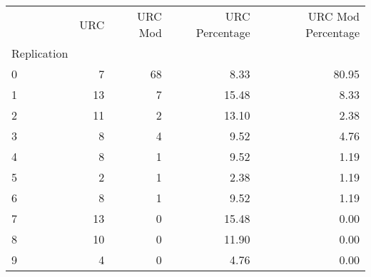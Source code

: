 \begin{tabular}{lrrrr}
\toprule
 & URC & URC Mod & URC Percentage & URC Mod Percentage \\
Replication &  &  &  &  \\
\midrule
0 & 7 & 68 & 8.33 & 80.95 \\
1 & 13 & 7 & 15.48 & 8.33 \\
2 & 11 & 2 & 13.10 & 2.38 \\
3 & 8 & 4 & 9.52 & 4.76 \\
4 & 8 & 1 & 9.52 & 1.19 \\
5 & 2 & 1 & 2.38 & 1.19 \\
6 & 8 & 1 & 9.52 & 1.19 \\
7 & 13 & 0 & 15.48 & 0.00 \\
8 & 10 & 0 & 11.90 & 0.00 \\
9 & 4 & 0 & 4.76 & 0.00 \\
\bottomrule
\end{tabular}
